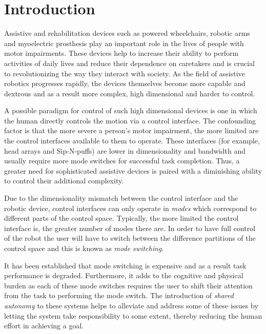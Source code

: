 \documentclass[conference]{IEEEtran}
\begin{document}
\IEEEpeerreviewmaketitle

\section{Introduction}

Assistive and rehabilitation devices such as powered wheelchairs, robotic arms and myoelectric prosthesis play an important role in the lives of people with motor impairments. These devices help to increase their ability to perform activities of daily lives and reduce their dependence on caretakers and is crucial to revolutionizing the way they interact with society. As the field of assistive robotics progresses rapidly, the devices themselves become more capable and dextrous and as a result more complex, high dimensional and harder to control. 

A possible paradigm for control of such high dimensional devices is one in which the human directly controls the motion via a control interface. The confounding factor is that the more severe a person's motor impairment, the more limited are the control interfaces available to them to operate. These interfaces (for example, head arrays and Sip-N-puffs) are lower in dimensionality and bandwidth and usually require more mode switches for successful task completion. Thus, a greater need for sophisticated assistive devices is paired with a diminishing ability to control their additional complexity. 

Due to the dimensionality mismatch between the control interface and the robotic device, control interfaces can only operate in \textit{modes} which correspond to different parts of the control space. Typically, the more limited the control interface is, the greater number of modes there are. In order to have full control of the robot the user will have to switch between the difference partitions of the control space and this is known as \textit{mode switching}. 

It has been established that mode switching is expensive and as a result task performance is degraded. Furthermore, it adds to the cognitive and physical burden as each of these mode switches requires the user to shift their attention from the task to performing the mode switch. The introduction of \textit{shared autonomy} to these systems helps to alleviate and address some of these issues by letting the system take responsibility to some extent, thereby reducing the human effort in achieving a goal. 
\end{document}
